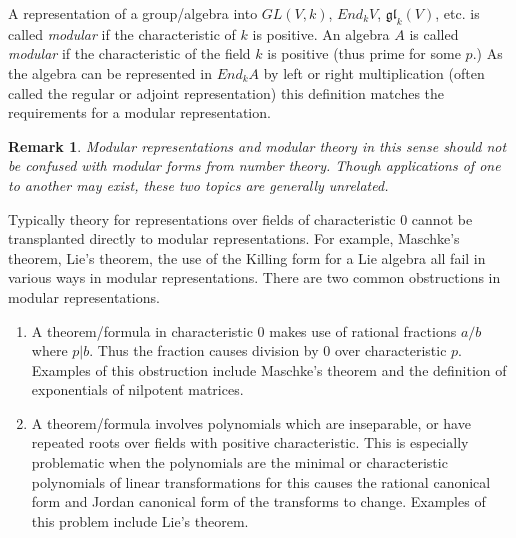 \documentclass[12pt]{article}
\newtheorem{remark}[thm]{Remark}
\begin{document}
A representation of a group/algebra into $GL(V,k)$, $End_k V$, $\mathfrak{gl}_k(V)$, etc. is called \emph{modular} if the 
characteristic of $k$ is positive.  An algebra $A$ is called 
\emph{modular} if the characteristic of the field $k$ 
is positive (thus prime for some $p$.)  As the algebra can be represented
in $End_k A$ by left or right multiplication (often called the regular or 
adjoint representation) this definition
matches the requirements for a modular representation.

\begin{remark}
Modular representations and modular theory in this sense should not be confused with modular forms from number theory.  Though applications of one to another may exist, these two topics are generally unrelated.
\end{remark}

Typically theory for representations over fields of characteristic 0 cannot be
transplanted directly to modular representations.  For example, Maschke's theorem, Lie's theorem, the use of the Killing form for a Lie algebra
all fail in various ways in modular representations.  There are two common obstructions in modular representations.
\begin{enumerate}
\item A theorem/formula in characteristic 0 makes use of rational fractions
$a/b$ where $p|b$.  Thus the fraction causes division by 0 over characteristic
$p$.  Examples of this obstruction include Maschke's theorem and the definition
of exponentials of nilpotent matrices.
\item A theorem/formula involves polynomials which are inseparable, or have
repeated roots over fields with positive characteristic.  This is especially
problematic when the polynomials are the minimal or characteristic polynomials of linear transformations for this causes the rational canonical form and Jordan canonical form of the transforms to change.  Examples of this problem include Lie's theorem.
\end{enumerate}
\end{document}
